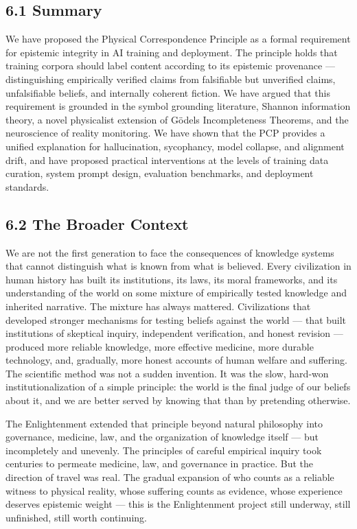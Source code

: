 \documentclass[
]{article}
\begin{document}
\subsection{6.1 Summary}\label{summary}

We have proposed the Physical Correspondence Principle as a formal
requirement for epistemic integrity in AI training and deployment. The
principle holds that training corpora should label content according to
its epistemic provenance --- distinguishing empirically verified claims
from falsifiable but unverified claims, unfalsifiable beliefs, and
internally coherent fiction. We have argued that this requirement is
grounded in the symbol grounding literature, Shannon information theory,
a novel physicalist extension of Gödel\textquotesingle s Incompleteness
Theorems, and the neuroscience of reality monitoring. We have shown that
the PCP provides a unified explanation for hallucination, sycophancy,
model collapse, and alignment drift, and have proposed practical
interventions at the levels of training data curation, system prompt
design, evaluation benchmarks, and deployment standards.

\subsection{6.2 The Broader Context}\label{the-broader-context}

We are not the first generation to face the consequences of knowledge
systems that cannot distinguish what is known from what is believed.
Every civilization in human history has built its institutions, its
laws, its moral frameworks, and its understanding of the world on some
mixture of empirically tested knowledge and inherited narrative. The
mixture has always mattered. Civilizations that developed stronger
mechanisms for testing beliefs against the world --- that built
institutions of skeptical inquiry, independent verification, and honest
revision --- produced more reliable knowledge, more effective medicine,
more durable technology, and, gradually, more honest accounts of human
welfare and suffering. The scientific method was not a sudden invention.
It was the slow, hard-won institutionalization of a simple principle:
the world is the final judge of our beliefs about it, and we are better
served by knowing that than by pretending otherwise.

The Enlightenment extended that principle beyond natural philosophy into
governance, medicine, law, and the organization of knowledge itself ---
but incompletely and unevenly. The principles of careful empirical
inquiry took centuries to permeate medicine, law, and governance in
practice. But the direction of travel was real. The gradual expansion of
who counts as a reliable witness to physical reality, whose suffering
counts as evidence, whose experience deserves epistemic weight --- this
is the Enlightenment project still underway, still unfinished, still
worth continuing.
\end{document}
